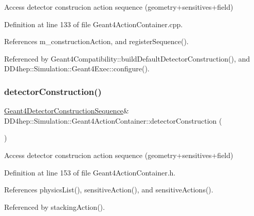 Access detector construcion action sequence (geometry+sensitives+field) 



Definition at line 133 of file Geant4\+Action\+Container.\+cpp.



References m\+\_\+construction\+Action, and register\+Sequence().



Referenced by Geant4\+Compatibility\+::build\+Default\+Detector\+Construction(), and D\+D4hep\+::\+Simulation\+::\+Geant4\+Exec\+::configure().

\hypertarget{class_d_d4hep_1_1_simulation_1_1_geant4_action_container_a21020ac85efccf58c0b292d25a954a15}{}\label{class_d_d4hep_1_1_simulation_1_1_geant4_action_container_a21020ac85efccf58c0b292d25a954a15} 
\subsubsection{\texorpdfstring{detector\+Construction()}{detectorConstruction()}\hspace{0.1cm}{\footnotesize\ttfamily [2/2]}}
{\footnotesize\ttfamily \hyperlink{class_d_d4hep_1_1_simulation_1_1_geant4_detector_construction_sequence}{Geant4\+Detector\+Construction\+Sequence}\& D\+D4hep\+::\+Simulation\+::\+Geant4\+Action\+Container\+::detector\+Construction (\begin{DoxyParamCaption}{ }\end{DoxyParamCaption})\hspace{0.3cm}{\ttfamily [inline]}}



Access detector construcion action sequence (geometry+sensitives+field) 



Definition at line 153 of file Geant4\+Action\+Container.\+h.



References physics\+List(), sensitive\+Action(), and sensitive\+Actions().



Referenced by stacking\+Action().

\hypertarget{class_d_d4hep_1_1_simulation_1_1_geant4_action_container_ab195f38387e12afbfcaccee77ec67845}{}\label{class_d_d4hep_1_1_simulation_1_1_geant4_action_container_ab195f38387e12afbfcaccee77ec67845} 
